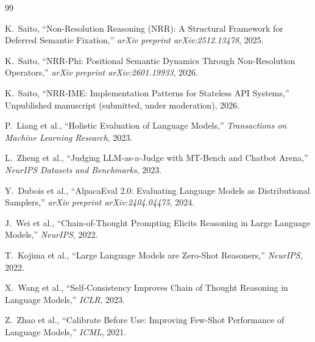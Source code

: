 \documentclass[11pt,a4paper]{article}
\begin{document}
\begin{thebibliography}{99}

K.~Saito,
\newblock ``Non-Resolution Reasoning (NRR): A Structural Framework for Deferred Semantic Fixation,''
\newblock \emph{arXiv preprint arXiv:2512.13478}, 2025.

K.~Saito,
\newblock ``NRR-Phi: Positional Semantic Dynamics Through Non-Resolution Operators,''
\newblock \emph{arXiv preprint arXiv:2601.19933}, 2026.

K.~Saito,
\newblock ``NRR-IME: Implementation Patterns for Stateless API Systems,''
\newblock Unpublished manuscript (submitted, under moderation), 2026.

P.~Liang et al.,
\newblock ``Holistic Evaluation of Language Models,''
\newblock \emph{Transactions on Machine Learning Research}, 2023.

L.~Zheng et al.,
\newblock ``Judging LLM-as-a-Judge with MT-Bench and Chatbot Arena,''
\newblock \emph{NeurIPS Datasets and Benchmarks}, 2023.

Y.~Dubois et al.,
\newblock ``AlpacaEval 2.0: Evaluating Language Models as Distributional Samplers,''
\newblock \emph{arXiv preprint arXiv:2404.04475}, 2024.

J.~Wei et al.,
\newblock ``Chain-of-Thought Prompting Elicits Reasoning in Large Language Models,''
\newblock \emph{NeurIPS}, 2022.

T.~Kojima et al.,
\newblock ``Large Language Models are Zero-Shot Reasoners,''
\newblock \emph{NeurIPS}, 2022.

X.~Wang et al.,
\newblock ``Self-Consistency Improves Chain of Thought Reasoning in Language Models,''
\newblock \emph{ICLR}, 2023.

Z.~Zhao et al.,
\newblock ``Calibrate Before Use: Improving Few-Shot Performance of Language Models,''
\newblock \emph{ICML}, 2021.

\end{thebibliography}
\end{document}

